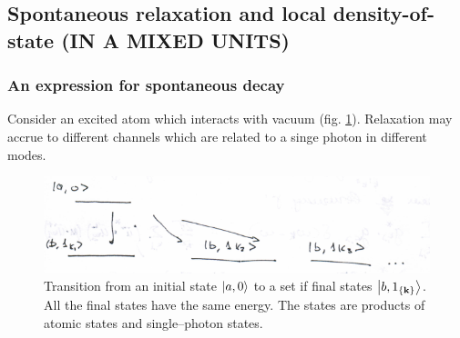 \subsection{Spontaneous relaxation and local density-of-state (IN A MIXED UNITS)}

\subsubsection{An expression for spontaneous decay}

Consider an excited atom which interacts with vacuum (fig. \ref{fig:relaxation}).	Relaxation may accrue to different channels which are related to a singe photon in different modes.

\begin{figure}
	\centering
	\includegraphics[width=0.7\linewidth]{fig/L8/relaxation}
	\caption{Transition from an initial state $\left\lvert {a,0} \right\rangle$ to a set if final states $\left\lvert {b, 1_{\left\{ \mathbf{k}\right\}}} \right\rangle$. All the final states have the same energy. The states are products of atomic states and single--photon states.}
	\label{fig:relaxation}
\end{figure}

